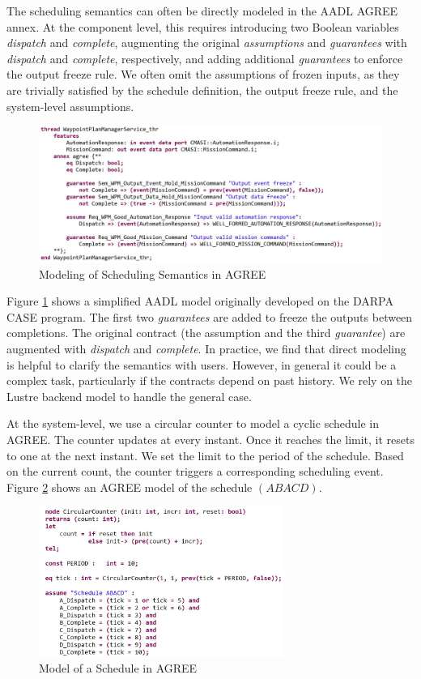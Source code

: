The scheduling semantics can often be directly modeled in the AADL AGREE annex. At the component level, this requires introducing two Boolean variables \emph{dispatch} and \emph{complete}, augmenting the original \emph{assumptions} and \emph{guarantees} with \emph{dispatch} and \emph{complete}, respectively, and adding additional \emph{guarantees} to enforce the output freeze rule. We often omit the assumptions of frozen inputs, as they are trivially satisfied by the schedule definition, the output freeze rule, and the system-level assumptions.

\begin{figure}[ht!]
\centering
\includegraphics[width=130mm]{wpmAGREE3.jpg}
\caption{Modeling of Scheduling Semantics in AGREE\label{wpmAGREE}}
\end{figure}

Figure \ref{wpmAGREE} shows a simplified AADL model originally developed on the DARPA CASE program. The first two \emph{guarantees} are added to freeze the outputs between completions. The original contract (the assumption and the third \emph{guarantee}) are augmented with \emph{dispatch} and \emph{complete}.
In practice, we find that direct modeling is helpful to clarify the semantics with users. However, in general it could be a complex task, particularly if the contracts depend on past history. We rely on the Lustre backend model to handle the general case.

At the system-level, we use a circular counter to model a cyclic schedule in AGREE. 
The counter updates at every instant. Once it reaches the limit, it resets to one at the next instant.
We set the limit to the period of the schedule. 
Based on the current count, the counter triggers a corresponding scheduling event.
Figure \ref{schedule} shows an AGREE model of the schedule $(ABACD)$.

\begin{figure}[ht!]
\centering
\includegraphics[width=80mm]{schedule.jpg}
\caption{Model of a Schedule in AGREE\label{schedule}}
\end{figure}

